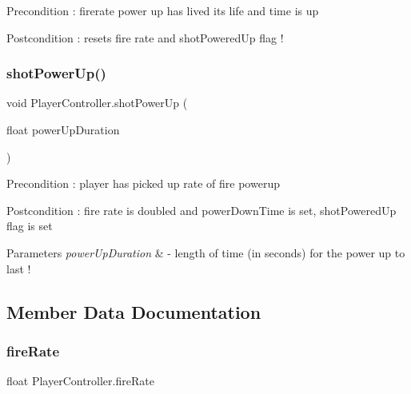 \begin{DoxyPrecond}{Precondition}
\+: firerate power up has lived its life and time is up 
\end{DoxyPrecond}
\begin{DoxyPostcond}{Postcondition}
\+: resets fire rate and shot\+Powered\+Up flag ! 
\end{DoxyPostcond}
\mbox{\label{class_player_controller_acbd4651a9689e6e27538e149b0e3f2a9}} 
\subsubsection{\texorpdfstring{shotPowerUp()}{shotPowerUp()}}
{\footnotesize\ttfamily void Player\+Controller.\+shot\+Power\+Up (\begin{DoxyParamCaption}\item[{float}]{power\+Up\+Duration }\end{DoxyParamCaption})}

\begin{DoxyPrecond}{Precondition}
\+: player has picked up rate of fire powerup 
\end{DoxyPrecond}
\begin{DoxyPostcond}{Postcondition}
\+: fire rate is doubled and power\+Down\+Time is set, shot\+Powered\+Up flag is set 
\end{DoxyPostcond}

\begin{DoxyParams}{Parameters}
{\em power\+Up\+Duration} & -\/ length of time (in seconds) for the power up to last ! \\
\hline
\end{DoxyParams}


\subsection{Member Data Documentation}
\mbox{\label{class_player_controller_aec1e8f25c69ea198fe38f965307437a4}} 
\subsubsection{\texorpdfstring{fireRate}{fireRate}}
{\footnotesize\ttfamily float Player\+Controller.\+fire\+Rate}


